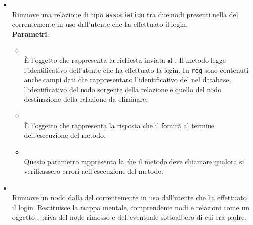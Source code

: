 \begin{itemize}
\begin{itemize}
\\ \textbf{Parametri}:
\begin{itemize}
\item {}
\\ Rappresenta la richiesta inviata al .
\item {}
\\ Rappresenta la risposta che fornirà il .
\item {}
\\ \dpNext
\item {}
\\ Rappresenta l'identificativo dell'associazione.
\end{itemize}
\item {}
\\ Rimuove una relazione di tipo \texttt{association} tra due nodi presenti nella  del  correntemente in uso dall’utente che ha effettuato il login.
\\ \textbf{Parametri}:
\begin{itemize}
\item {}
\\ \`E l’oggetto che rappresenta la richiesta inviata al . Il metodo legge l’identificativo dell’utente che ha effettuato la login. In \texttt{req} sono contenuti anche campi dati che rappresentano l’identificativo del  nel database, l’identificativo del nodo sorgente della relazione e quello del nodo destinazione della relazione da eliminare.
\item {}
\\ \`E l’oggetto che rappresenta la risposta che il  fornirà al termine dell’esecuzione del metodo.
\item {}
\\ Questo parametro rappresenta la  che il metodo deve chiamare qualora si verificassero errori nell'esecuzione del metodo.
\end{itemize}
\item {}
\\ Rimuove un nodo dalla  del  correntemente in uso dall’utente che ha effettuato il login. Restituisce la mappa mentale, comprendente nodi e relazioni come un oggetto , priva del nodo rimosso e dell’eventuale sottoalbero di cui era padre.

\end{itemize}
\end{itemize}
